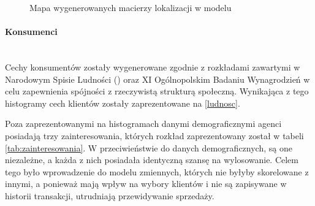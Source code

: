 \documentclass[polish, twoside, 12pt, a4paper]{article}
\theoremstyle{definition}
\theoremstyle{plain}
\theoremstyle{remark}
\begin{document}
\begin{figure}[hbt]
  \captionsetup{margin=10pt,font=small,labelfont=bf,width=.8\textwidth}

  \caption[Krótka nazwa II]{Mapa wygenerowanych macierzy lokalizacji w modelu}\label{fig:xxx}
\end{figure}

\paragraph{Konsumenci}\mbox{}\\
Cechy konsumentów zostały wygenerowane zgodnie z rozkładami zawartymi w Narodowym Spisie Ludności (\cite{GUS2011}) oraz XI Ogólnopolskim Badaniu Wynagrodzień \cite{Sedlak2013} w celu zapewnienia spójności z rzeczywistą strukturą społeczną. Wynikająca z tego histogramy cech klientów zostały zaprezentowane na \ref{ludnosc}. 

Poza zaprezentowanymi na histogramach danymi demograficznymi agenci posiadają trzy zainteresowania, których rozkład zaprezentowany został w tabeli \ref{tab:zainteresowania}. W przeciwieństwie do danych demograficznych, są one niezależne, a każda z nich posiadała identyczną szansę na wylosowanie. Celem tego było wprowadzenie do modelu zmiennych, których nie byłyby skorelowane z innymi, a ponieważ mają wpływ na wybory klientów i nie są zapisywane w historii transakcji, utrudniają przewidywanie sprzedaży.
\end{document}
